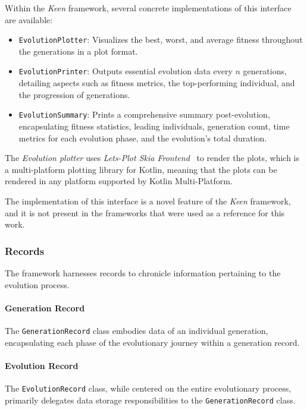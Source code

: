   Within the \textit{Keen} framework, several concrete implementations of this 
  interface are available:

  \begin{itemize}
    \item \texttt{EvolutionPlotter}: Visualizes the best, worst, and average 
      fitness throughout the generations in a plot format.
    \item \texttt{EvolutionPrinter}: Outputs essential evolution data every 
      \(n\) generations, detailing aspects such as fitness metrics, the 
      top-performing individual, and the progression of generations.
    \item \texttt{EvolutionSummary}: Prints a comprehensive summary 
      post-evolution, encapsulating fitness statistics, leading individuals, 
      generation count, time metrics for each evolution phase, and the 
      evolution's total duration.
  \end{itemize}

  \begin{remark}
    The \emph{Evolution plotter} uses \textit{Lets-Plot Skia Frontend}~\autocite{JetBrainsLetsplotskiaSkia} to render
    the plots, which is a multi-platform plotting library for Kotlin, meaning that the plots can be rendered in any 
    platform supported by Kotlin Multi-Platform.
  \end{remark}

  The implementation of this interface is a novel feature of the \textit{Keen}
  framework, and it is not present in the frameworks that were used as a
  reference for this work.

  \subsubsection{Records}
    The framework harnesses records to chronicle information pertaining to the 
    evolution process.

    \paragraph{Generation Record}
      The \texttt{GenerationRecord} class embodies data of an individual 
      generation, encapsulating each phase of the evolutionary journey within a 
      generation record.

    \paragraph{Evolution Record}
      The \texttt{EvolutionRecord} class, while centered on the entire 
      evolutionary process, primarily delegates data storage responsibilities 
      to the \texttt{GenerationRecord} class.
      